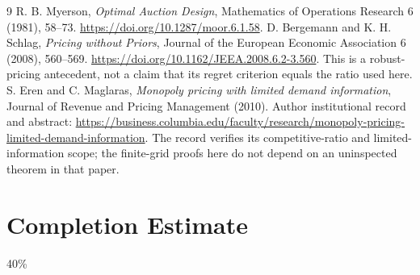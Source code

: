 \documentclass[11pt]{article}
\theoremstyle{remark}\newtheorem{remark}[theorem]{Remark}
\begin{document}
\begin{thebibliography}{9}
 R. B. Myerson, \emph{Optimal Auction Design}, Mathematics of Operations Research 6 (1981), 58--73. \url{https://doi.org/10.1287/moor.6.1.58}.
 D. Bergemann and K. H. Schlag, \emph{Pricing without Priors}, Journal of the European Economic Association 6 (2008), 560--569. \url{https://doi.org/10.1162/JEEA.2008.6.2-3.560}. This is a robust-pricing antecedent, not a claim that its regret criterion equals the ratio used here.
 S. Eren and C. Maglaras, \emph{Monopoly pricing with limited demand information}, Journal of Revenue and Pricing Management (2010). Author institutional record and abstract: \url{https://business.columbia.edu/faculty/research/monopoly-pricing-limited-demand-information}. The record verifies its competitive-ratio and limited-information scope; the finite-grid proofs here do not depend on an uninspected theorem in that paper.
\end{thebibliography}

\section{Completion Estimate}
40\%
\end{document}
